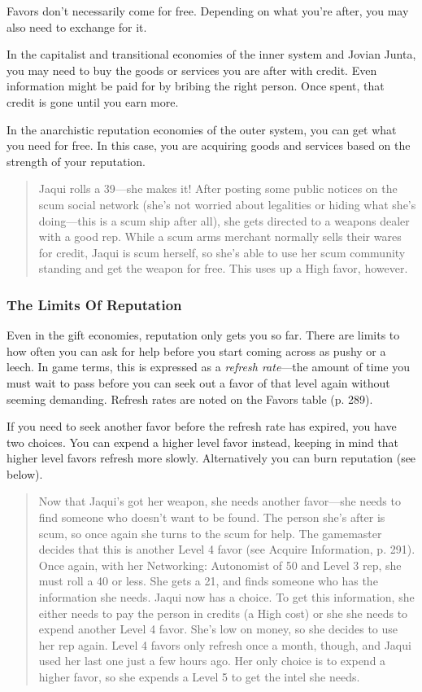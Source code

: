 Favors don't necessarily come for free. Depending on 
what you're after, you may also need to exchange for it.

In the capitalist and transitional economies of the 
inner system and Jovian Junta, you may need to buy 
the goods or services you are after with credit. Even information
might be paid for by bribing the right person.
Once spent, that credit is gone until you earn more.

In the anarchistic reputation economies of the outer 
system, you can get what you need for free. In this 
case, you are acquiring goods and services based on 
the strength of your reputation.

\begin{quotation}
Jaqui rolls a 39—she makes it! After posting some
public notices on the scum social network (she’s
not worried about legalities or hiding what she’s
doing—this is a scum ship after all), she gets directed
to a weapons dealer with a good rep. While
a scum arms merchant normally sells their wares
for credit, Jaqui is scum herself, so she’s able to use
her scum community standing and get the weapon
for free. This uses up a High favor, however.
\end{quotation}


\subsubsection{The Limits Of Reputation}

Even in the gift economies, reputation only gets you so 
far. There are limits to how often you can ask for help 
before you start coming across as pushy or a leech. In 
game terms, this is expressed as a \textit{refresh rate}—the 
amount of time you must wait to pass before you can 
seek out a favor of that level again without seeming 
demanding. Refresh rates are noted on the Favors 
table (p. 289).

If you need to seek another favor before the refresh 
rate has expired, you have two choices. You can 
expend a higher level favor instead, keeping in mind 
that higher level favors refresh more slowly. Alternatively
you can burn reputation (see below).

\begin{quotation}
Now that Jaqui’s got her weapon, she needs
another favor—she needs to find someone who
doesn’t want to be found. The person she’s after is
scum, so once again she turns to the scum for help.
The gamemaster decides that this is another Level
4 favor (see Acquire Information, p. 291). Once
again, with her Networking: Autonomist of 50 and
Level 3 rep, she must roll a 40 or less. She gets a
21, and finds someone who has the information
she needs.
Jaqui now has a choice. To get this information,
she either needs to pay the person in credits (a
High cost) or she she needs to expend another
Level 4 favor. She’s low on money, so she decides
to use her rep again. Level 4 favors only refresh
once a month, though, and Jaqui used her last one
just a few hours ago. Her only choice is to expend
a higher favor, so she expends a Level 5 to get the
intel she needs.
\end{quotation}


